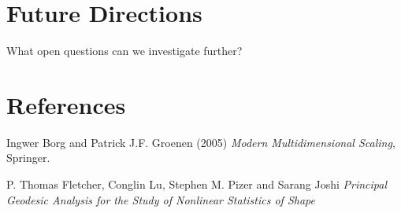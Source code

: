 \documentclass[12pt]{report}
\begin{document}
\chapter*{Future Directions}

What open questions can we investigate further?


\chapter*{References}
\begin{thebibliography}{9}


Ingwer Borg and Patrick J.F. Groenen (2005) \textit{Modern Multidimensional Scaling}, Springer.

P. Thomas Fletcher, Conglin Lu, Stephen M. Pizer and Sarang Joshi \textit{Principal Geodesic Analysis for the Study of
Nonlinear Statistics of Shape}



\end{thebibliography}
\end{document}
